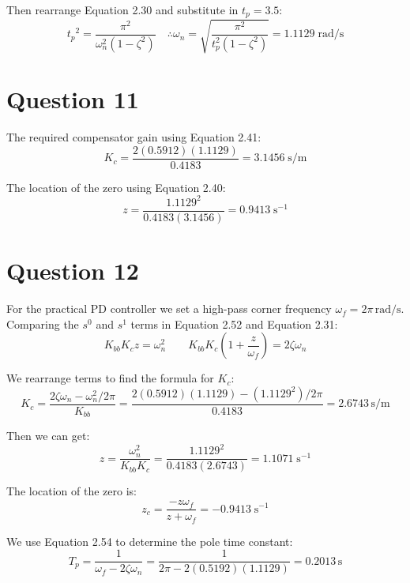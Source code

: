 \documentclass[12pt]{article}
\begin{document}
Then rearrange Equation 2.30 and substitute in $t_p = 3.5$:
\begin{equation*}
{t_p}^2 = \frac{\pi^2}{\omega_n^2 \left( 1 - \zeta^2 \right)} \quad \therefore \omega_n = \sqrt{\frac{\pi^2}{t_p^2 \left(1-\zeta^2\right)}} = 1.1129 \mathrm{\; rad/s} 
\end{equation*}

\section*{Question 11}
The required compensator gain using Equation 2.41:
\begin{equation*}
K_c = \frac{2(0.5912)(1.1129)}{0.4183} = 3.1456 \mathrm{\; s/m} 
\end{equation*}

The location of the zero using Equation 2.40:
\begin{equation*}
z = \frac{1.1129^2}{0.4183(3.1456)} = 0.9413 \mathrm{\; s^{-1}}
\end{equation*}

\section*{Question 12}
For the practical PD controller we set a high-pass corner frequency $\omega_f = 2\pi \mathrm{ \, rad/s}$. Comparing the $s^0$ and $s^1$ terms in Equation 2.52 and Equation 2.31:
\begin{equation*}
K_{bb} K_c z = \omega_n^2 \qquad K_{bb} K_c \left(1 + \frac{z}{\omega_f} \right) = 2\zeta \omega_n  
\end{equation*}

We rearrange terms to find the formula for $K_c$:
\begin{equation*}
K_c = \frac{2\zeta \omega_n - \omega_n^2 / 2\pi}{K_{bb}} = \frac{2(0.5912)(1.1129) - (1.1129^2)/2\pi}{0.4183} = 2.6743 \mathrm{\, s/m}
\end{equation*}

Then we can get:
\begin{equation*}
z = \frac{\omega_n^2}{K_{bb}K_{c}} = \frac{1.1129^2}{0.4183(2.6743)}=1.1071 \mathrm{\; s^{-1}}
\end{equation*}

The location of the zero is:
\begin{equation*}
z_c = \frac{-z \omega_f}{z + \omega_f} = -0.9413 \mathrm{\; s^{-1}}
\end{equation*}

We use Equation 2.54 to determine the pole time constant:
\begin{equation*}
T_p = \frac{1}{\omega_f - 2 \zeta \omega_n} = \frac{1}{2\pi - 2(0.5192)(1.1129)} = 0.2013 \mathrm{\,s} 
\end{equation*}
\end{document}
